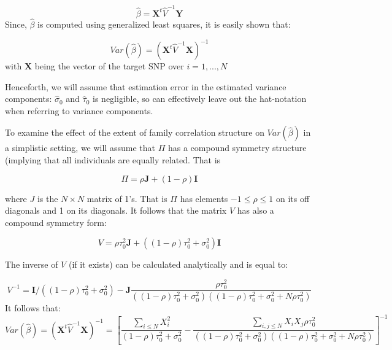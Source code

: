 \documentclass[10pt]{article}
\begin{document}
 \begin{equation*}
\hat{ \beta}= \mathbf{X}^t\hat{V}^{-1}\mathbf{Y}
\end{equation*}
Since, $\hat{ \beta}$ is computed using generalized least squares, it is easily shown that:

 \begin{equation*}
Var(\hat{ \beta})= (\mathbf{X}^t\hat{V}^{-1} \mathbf{X})^{-1}
\end{equation*}
with $\mathbf{X}$ being the vector of the target SNP over $i=1,...,N$


Henceforth, we will assume that estimation error in the estimated variance components:  $\hat{\sigma}_{0}$ and $\hat{\tau}_0$ is negligible, so can effectively leave out the hat-notation when referring to variance components.    

To examine the effect of the extent of family correlation structure on $Var(\hat{ \beta})$ in a simplistic setting, we will assume that $\Pi$ has a compound symmetry structure (implying that all individuals are equally related.  That is 

 \begin{equation*}
\Pi = \rho \mathbf{J} + (1-\rho)  \mathbf{I} 
\end{equation*}

where $J$ is the $N \times N$ matrix of 1's.  That is $\Pi$ has elements $-1 \leq \rho \leq 1$ on its off diagonals and 1 on its diagonals.  It follows that the matrix $V$ has also a compound symmetry form:

 \begin{equation*}
V= \rho \tau_0^2 \mathbf{J} + ((1-\rho)\tau_0^2 + \sigma_{0}^2)  \mathbf{I} 
\end{equation*}

The inverse of $V$ (if it exists) can be calculated analytically and is equal to:


 \begin{equation*}
V^{-1} = \mathbf{I}/((1-\rho)\tau_0^2 + \sigma_{0}^2) - \mathbf{J} \frac{\rho  \tau_0^2}{((1-\rho)\tau_0^2 + \sigma_{0}^2)((1-\rho)\tau_0^2 + \sigma_{0}^2 + N\rho  \tau_0^2)} 
\end{equation*}
It follows that:
 \begin{equation*}
Var(\hat{ \beta})= (\mathbf{X}^t\hat{V}^{-1} \mathbf{X})^{-1} =
[\frac{\sum_{i \leq N}X_{i}^2}{(1-\rho)\tau_0^2 + \sigma_{0}^2} - \frac{\sum_{i , j \leq N}X_{i}X_{j} \rho \tau_0^2}{((1-\rho)\tau_0^2 + \sigma_{0}^2)((1-\rho)\tau_0^2 + \sigma_{0}^2 + N\rho  \tau_0^2)}]^{-1}
\end{equation*}
\end{document}
